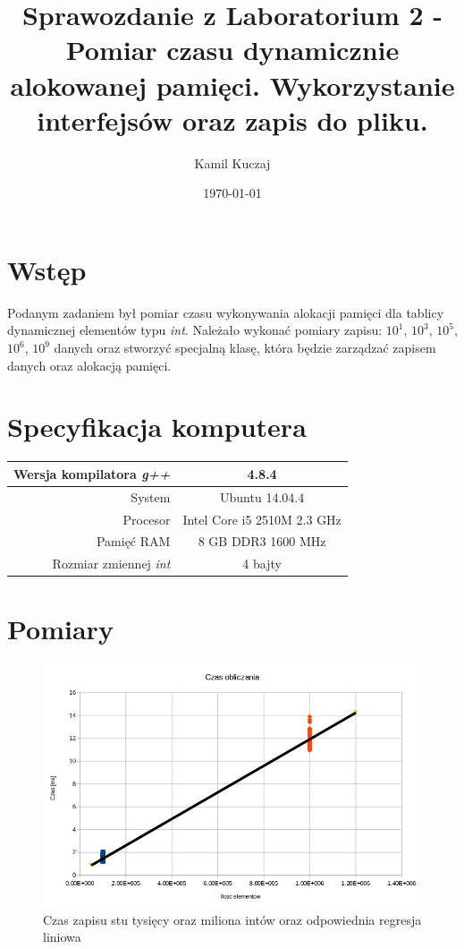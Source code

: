 \documentclass[11pt,a4paper]{article}
\author{Kamil Kuczaj}
\title{Sprawozdanie z Laboratorium 2 - Pomiar czasu dynamicznie alokowanej pamięci. Wykorzystanie interfejsów oraz zapis do pliku.}
\date{\today}
\begin{document}
\maketitle

\section{Wstęp}
Podanym zadaniem był pomiar czasu wykonywania alokacji pamięci dla tablicy dynamicznej elementów typu \textit{int}. Należało wykonać pomiary zapisu: $10^1$, $10^3$, $10^5$, $10^6$, $10^9$ danych oraz stworzyć specjalną klasę, która będzie zarządzać zapisem danych oraz alokacją pamięci.

\section{Specyfikacja komputera}

\begin{center}
	\begin{tabular}{| r | c |}
	\hline
	Wersja kompilatora \textit{g++} & 4.8.4 \\ \hline
	System & Ubuntu 14.04.4 \\ \hline
	Procesor	 & Intel Core i5 2510M 2.3 GHz \\ \hline
	Pamięć RAM & 8 GB DDR3 1600 MHz \\ \hline
	Rozmiar zmiennej \textit{int} & 4 bajty \\ \hline
	\end{tabular}
\end{center}

\section{Pomiary}

\begin{figure}[hb]
	\begin{center}
		\includegraphics[scale=0.5]{../wykresy/stotysiecy-milion.png}
		\caption{Czas zapisu stu tysięcy oraz miliona intów oraz odpowiednia regresja liniowa}
	\end{center}
\end{figure}
\end{document}
